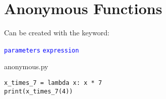 \documentclass[aspectratio=1610,slidestop]{beamer}
\newcommand{\decl}[1]{\textcolor{blue}{\lstinline{#1}}}
\begin{document}
\section{Anonymous Functions}

%
%


\begin{pframe}
 Can be created with the  keyword:
 \begin{pythondeclaration}
  \textvisiblespace\decl{parameters}\emp{:}\textvisiblespace
  \decl{expression}
 \end{pythondeclaration}
 \bigskip

 \begin{minipage}[t]{0.47\textwidth}
  \begin{pythonfile}{anonymous.py}
   \begin{verbatim}
x_times_7 = lambda x: x * 7
print(x_times_7(4))
   \end{verbatim}
  \end{pythonfile}
 \end{minipage}\qquad
 \pause
 \begin{minipage}[t]{0.47\textwidth}
 \begin{terminal}
 \end{terminal}
 \end{minipage}
\end{pframe}
\end{document}
